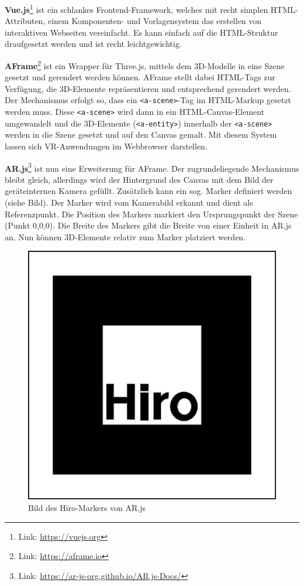\textbf{Vue.js}\footnote{Link: \url{https://vuejs.org}} ist ein
schlankes Frontend-Framework, welches mit recht simplen HTML-Attributen,
einem Komponenten- und Vorlagensystem das erstellen von interaktiven
Webseiten vereinfacht. Es kann einfach auf die HTML-Struktur
draufgesetzt werden und ist recht leichtgewichtig.

\textbf{AFrame}\footnote{Link: \url{https://aframe.io}} ist ein Wrapper
für Three.js, mittels dem 3D-Modelle in eine Szene gesetzt und gerendert
werden können. AFrame stellt dabei HTML-Tags zur Verfügung, die
3D-Elemente repräsentieren und entsprechend gerendert werden. Der
Mechanismus erfolgt so, dass ein
\texttt{\textless{}a-scene\textgreater{}}-Tag im HTML-Markup gesetzt
werden muss. Diese \texttt{\textless{}a-scene\textgreater{}} wird dann
in ein HTML-Canvas-Element umgewandelt und die 3D-Elemente
(\texttt{\textless{}a-entity\textgreater{}}) innerhalb der
\texttt{\textless{}a-scene\textgreater{}} werden in die Szene gesetzt
und auf den Canvas gemalt. Mit diesem System lassen sich VR-Anwendungen
im Webbrowser darstellen.

\textbf{AR.js}\footnote{Link:
  \url{https://ar-js-org.github.io/AR.js-Docs/}} ist nun eine
Erweiterung für AFrame. Der zugrundeliegende Mechanismus bleibt gleich,
allerdings wird der Hintergrund des Canvas mit dem Bild der
geräteinternen Kamera gefüllt. Zusätzlich kann ein sog. Marker definiert
werden (siehe Bild). Der Marker wird vom Kamerabild erkannt und dient
als Referenzpunkt. Die Position des Markers markiert den Ursprungspunkt
der Szene (Punkt 0,0,0). Die Breite des Markers gibt die Breite von
einer Einheit in AR.js an. Nun können 3D-Elemente relativ zum Marker
platziert werden.

\begin{figure}
\centering
\includegraphics{img/hiro.png}
\caption{Bild des Hiro-Markers von AR.js}
\end{figure}

